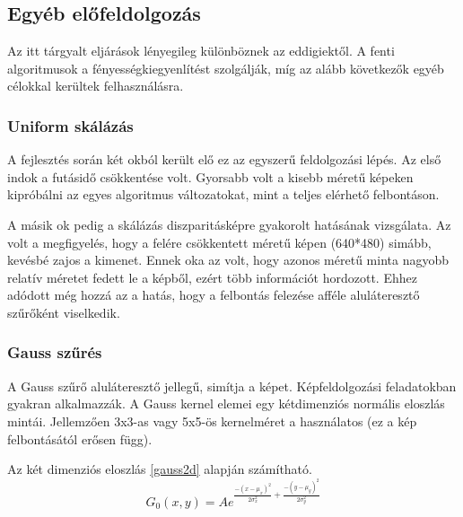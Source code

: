\subsection{Egyéb előfeldolgozás}\label{sect:miscPreproc}

Az itt tárgyalt eljárások lényegileg különböznek az eddigiektől.
A fenti algoritmusok a fényességkiegyenlítést szolgálják, míg az alább következők egyéb célokkal kerültek felhasználásra.

\subsubsection{Uniform skálázás}\label{sect:scale}

A fejlesztés során két okból került elő ez az egyszerű feldolgozási lépés.
Az első indok a futásidő csökkentése volt.
Gyorsabb volt a kisebb méretű képeken kipróbálni az egyes algoritmus változatokat, mint a teljes elérhető felbontáson.

A másik ok pedig a skálázás diszparitásképre gyakorolt hatásának vizsgálata.
Az volt a megfigyelés, hogy a felére csökkentett méretű képen (640*480) simább, kevésbé zajos a kimenet.
Ennek oka az volt, hogy azonos méretű minta nagyobb relatív méretet fedett le a képből, ezért több információt hordozott.
Ehhez adódott még hozzá az a hatás, hogy a felbontás felezése afféle aluláteresztő szűrőként viselkedik.

\subsubsection{Gauss szűrés}\label{sect:gaussian}

A Gauss szűrő aluláteresztő jellegű, simítja a képet.
Képfeldolgozási feladatokban gyakran alkalmazzák.
A Gauss kernel elemei egy kétdimenziós normális eloszlás mintái.
Jellemzően 3x3-as vagy 5x5-ös kernelméret a használatos (ez a kép felbontásától erősen függ).

Az két dimenziós eloszlás \eqref{gauss2d} alapján számítható.
\begin{equation}
G_0(x,y) = A e^{\frac{-(x-\mu_x)^2}{2 \sigma_x^2}+\frac{-(y-\mu_y)^2}{2 \sigma_y^2}}
\label{eq:gauss2d}
\end{equation}

